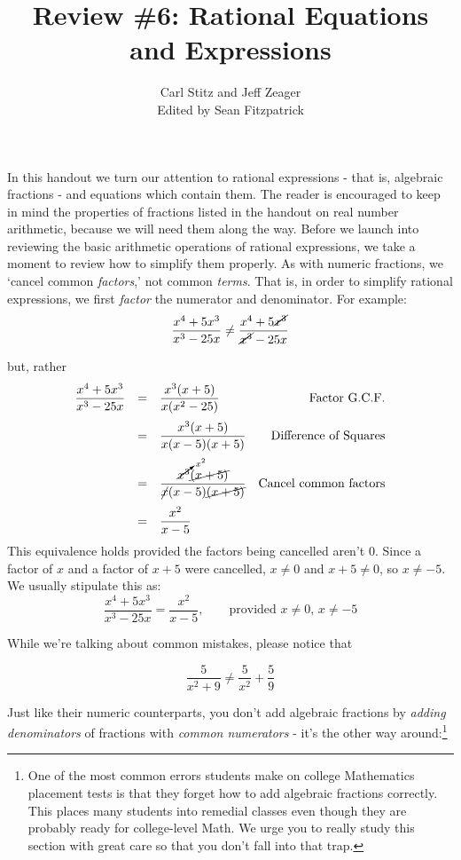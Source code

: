 \documentclass[11pt]{article}
\title{Review \#6: Rational Equations and Expressions}
\author{Carl Stitz and Jeff Zeager\\
Edited by Sean Fitzpatrick}
\theoremstyle{definition}  %
\begin{document}
\maketitle


\renewcommand{\headrulewidth}{0pt}
\renewcommand{\headheight}{14pt}
\lhead[\fancyplain{}{\sc\thepage}]%
      {\fancyplain{}{\sc \nouppercase{\rightmark}}}
\rhead[\fancyplain{}{\sc \nouppercase{\leftmark}}]%
      {\fancyplain{}{\sc\thepage}}
\cfoot{}

In this handout we turn our attention to rational expressions - that is, algebraic fractions - and equations which contain them.  The reader is encouraged to keep in mind the properties of fractions listed in the handout on real number arithmetic, because we will need them along the way.  Before we launch into reviewing the basic arithmetic operations of rational expressions, we take a moment to review how to simplify them properly.  As with numeric fractions, we `cancel common \textit{factors},' not common \textit{terms}.  That is, in order to simplify rational expressions, we first \textit{factor} the numerator and denominator.  For example:  \[ \dfrac{x^4 + 5x^3}{x^3 - 25x} \neq \dfrac{x^4 + 5\cancel{x^3}}{\cancel{x^3} - 25x} \]

but, rather \[ \begin{array}{rclr}

\dfrac{x^4 + 5x^3}{x^3 - 25x} & = & \dfrac{x^3(x + 5)}{x(x^2-25)} & \text{Factor G.C.F.} \\ [12pt]
                             & = & \dfrac{x^3(x + 5)}{x(x-5)(x+5)} & \text{Difference of Squares} \\ [12pt]
														& = & \dfrac{\cancelto{x^2}{x^3}\cancel{(x + 5)}}{\cancel{x}(x-5)\cancel{(x+5)}} & \text{Cancel common factors}\\ [12pt]                         
														& = & \dfrac{x^2}{x-5} & \\ \end{array}\] This equivalence holds provided the factors being cancelled aren't $0$. Since a factor of $x$ and a factor of $x+5$ were cancelled, $x \neq 0$ and $x+5 \neq 0$, so $x \neq -5$.   We usually stipulate this as: \[ \dfrac{x^4 + 5x^3}{x^3 - 25x}  = \dfrac{x^2}{x-5}, \qquad \text{provided $x \neq 0$, $x \neq -5$} \]

While we're talking about common mistakes, please notice that 

\[ \dfrac{5}{x^2+9} \neq \dfrac{5}{x^2} + \dfrac{5}{9} \] 

Just like their numeric counterparts, you don't add algebraic fractions by \textit{adding denominators} of fractions with \textit{common numerators} - it's the other way around:\footnote{One of the most common errors students make on college Mathematics placement tests is that they forget how to add algebraic fractions correctly.  This places many students into remedial classes even though they are probably ready for college-level Math.  We urge you to really study this section with great care so that you don't fall into that trap.} 
\end{document}
